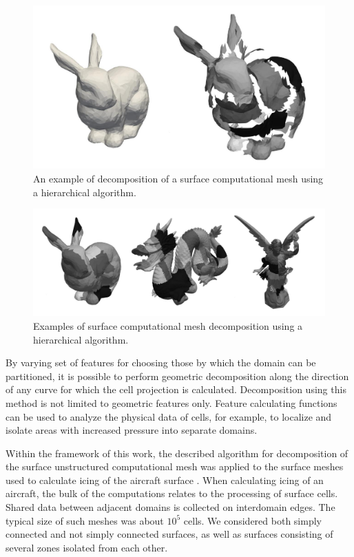 \documentclass[
11pt,%
tightenlines,%
twoside,%
onecolumn,%
nofloats,%
nobibnotes,%
nofootinbib,%
superscriptaddress,%
noshowpacs,%
centertags]%
{revtex4}
\begin{document}
\begin{figure}[h]
\includegraphics[width=1.0\textwidth]{pics/03-explode-bunny.pdf}
\caption{An example of decomposition of a surface computational mesh using a hierarchical algorithm.}\label{fig:03-explode-bunny}
\end{figure}

\begin{figure}[h]
\includegraphics[width=1.0\textwidth]{pics/03-hierarch.pdf}
\caption{Examples of surface computational mesh decomposition using a hierarchical algorithm.}\label{fig:03-hierarch}
\end{figure}

By varying set of features for choosing those by which the domain can be partitioned, it is possible to perform geometric decomposition along the direction of any curve for which the cell projection is calculated.
Decomposition using this method is not limited to geometric features only.
Feature calculating functions can be used to analyze the physical data of cells, for example, to localize and isolate areas with increased pressure into separate domains.

Within the framework of this work, the described algorithm for decomposition of the surface unstructured computational mesh was applied to the surface meshes used to calculate icing of the aircraft surface \cite{Wright_Icing,Bourgault_Icing}.
When calculating icing of an aircraft, the bulk of the computations relates to the processing of surface cells.
Shared data between adjacent domains is collected on interdomain edges.
The typical size of such meshes was about $ 10^5 $ cells. We considered both simply connected and not simply connected surfaces, as well as surfaces consisting of several zones isolated from each other.
\end{document}
